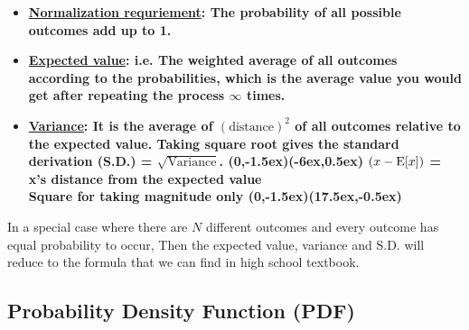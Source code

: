 \documentclass[class=article, crop=false, 12pt]{standalone}
\begin{document}
\begin{itemize}
    \item \bf{\ul{Normalization requriement}}:
    The probability of all possible outcomes add up to 1.

    \item \bf{\ul{Expected value}}: 
    i.e. The weighted average of all outcomes according to the probabilities,
    which is the average value you would get after repeating the process $\infty$ times.

    \item \bf{\ul{Variance}}:
    It is the average of $(\text{distance})^2$ of all outcomes relative to the expected value.
    Taking square root gives the \bf{standard derivation} (S.D.) = $\sqrt{\text{Variance}}$. 
    {(0,-1.5ex)}{(-6ex,0.5ex)}
    {\scriptsize $(x-\E{x})$ = x's distance from the expected value\\[-1ex] \scriptsize Square for taking magnitude only}
    {(0,-1.5ex)}{(17.5ex,-0.5ex)}
    
\end{itemize}

\begin{notation}
    In a special case where there are $N$ different outcomes and every outcome has equal probability to occur,
    Then the expected value, variance and S.D. will reduce to the formula that we can find in high school textbook.

\end{notation}


\subsection{Probability Density Function (PDF)}
\end{document}
